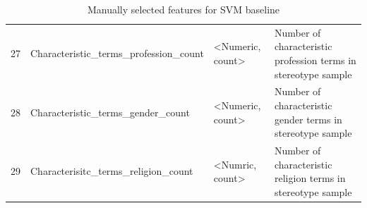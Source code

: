 \begin{table}[]
{\begin{tabular}{@{}llll@{}}
27 & Characteristic\_terms\_profession\_count & \textless{}Numeric, count\textgreater{} & Number of characteristic profession terms in stereotype sample              \\
28 & Characteristic\_terms\_gender\_count     & \textless{}Numeric, count\textgreater{} & Number of characteristic gender terms in stereotype sample                  \\
29 & Characterisitc\_terms\_religion\_count   & \textless{}Numric, count\textgreater{}  & Number of characteristic religion terms in stereotype sample                \\ \bottomrule
\end{tabular}%
}
\caption{Manually selected features for SVM baseline}
\label{tab:features}
\end{table}



